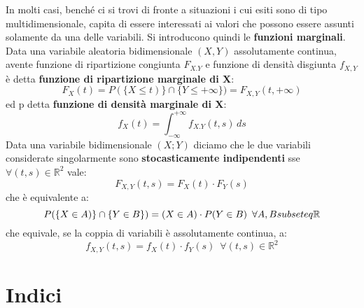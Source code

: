 \documentclass[a4paper,12pt, oneside]{book}
\begin{document}
In molti casi, benché ci si trovi di fronte a situazioni i cui esiti sono di tipo multidimensionale, capita di essere interessati ai valori che possono essere assunti
solamente da una delle variabili. Si introducono quindi le \textbf{funzioni marginali}.\\
Data una variabile aleatoria bidimensionale $(X,Y)$ assolutamente continua, avente funzione di ripartizione congiunta $F_{X.Y}$ e funzione di densità disgiunta $f_{X,Y}$
è detta \textbf{funzione di ripartizione marginale di X}:
\[F_X(t)=P(\{X\leq t)\}\cap\{Y\leq +\infty\})=F_{X,Y}(t,+\infty)\]
ed p detta \textbf{funzione di densità marginale di X}:
\[f_X(t)=\int_{-\infty}^{+\infty}f_{X.Y}(t,s)\,ds\]
Data una variabile bidimensionale $(X;Y)$ diciamo che le due variabili considerate singolarmente sono \textbf{stocasticamente indipendenti} sse $\forall (t,s)\in\mathbb{R}^2$ vale:
\[F_{X,Y}(t,s)=F_X(t)\cdot F_Y(s)\]
che è equivalente a:
\[P(\{X\in A)\}\cap\{Y\in B\})=(X\in A)\cdot P(Y\in B)\,\,\,\forall A,B\\subseteq \mathbb{R}\]
che equivale, se la coppia di variabili è assolutamente continua, a:
\[f_{X,Y}(t,s)=f_X(t)\cdot f_Y(s)\,\,\,\forall (t,s)\in \mathbb{R}^2\]
\section{Indici}
\end{document}
